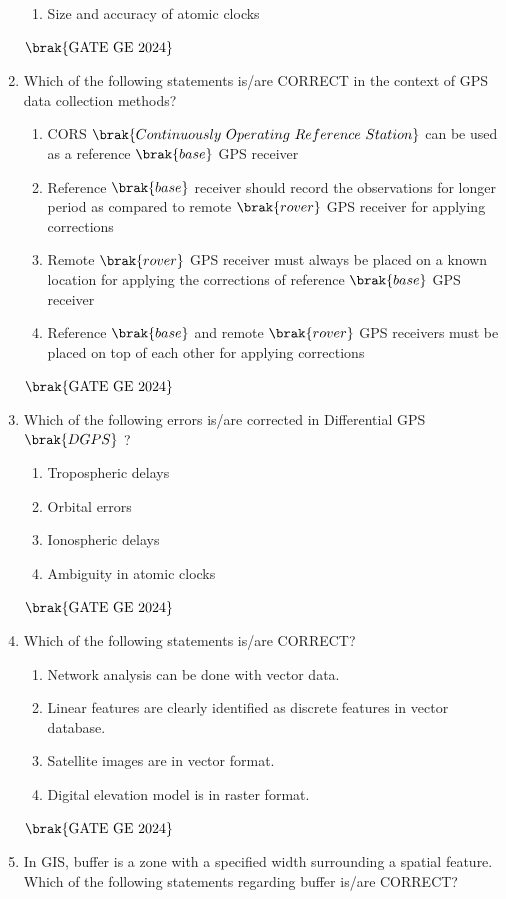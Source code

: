 \documentclass[journal,12pt,onecolumn]{IEEEtran}
\theoremstyle{remark}
\begin{document}
\begin{enumerate}
\begin{enumerate}
\item Size and accuracy of atomic clocks
\end{enumerate}
\hfill $\brak{\text{GATE GE 2024}}$
\bigskip
\item Which of the following statements is/are CORRECT in the context of GPS data collection methods?
\begin{enumerate}
\item CORS $\brak{Continuously\ Operating\ Reference\ Station}$ can be used as a reference $\brak{base}$ GPS receiver
\item Reference $\brak{base}$ receiver should record the observations for longer period as compared to remote $\brak{rover}$ GPS receiver for applying corrections
\item Remote $\brak{rover}$ GPS receiver must always be placed on a known location for applying the corrections of reference $\brak{base}$ GPS receiver
\item Reference $\brak{base}$ and remote $\brak{rover}$ GPS receivers must be placed on top of each other for applying corrections
\end{enumerate}
\hfill $\brak{\text{GATE GE 2024}}$
\bigskip
\item Which of the following errors is/are corrected in Differential GPS $\brak{DGPS}$ ?
\begin{enumerate}
\item Tropospheric delays
\item Orbital errors
\item Ionospheric delays
\item Ambiguity in atomic clocks
\end{enumerate}
\hfill $\brak{\text{GATE GE 2024}}$
\bigskip
\item Which of the following statements is/are CORRECT?
\begin{enumerate}
\item Network analysis can be done with vector data.
\item Linear features are clearly identified as discrete features in vector database.
\item Satellite images are in vector format.
\item Digital elevation model is in raster format.
\end{enumerate}
\hfill $\brak{\text{GATE GE 2024}}$
\bigskip
\item In GIS, buffer is a zone with a specified width surrounding a spatial feature.
Which of the following statements regarding buffer is/are CORRECT?

\end{enumerate}
\end{document}
